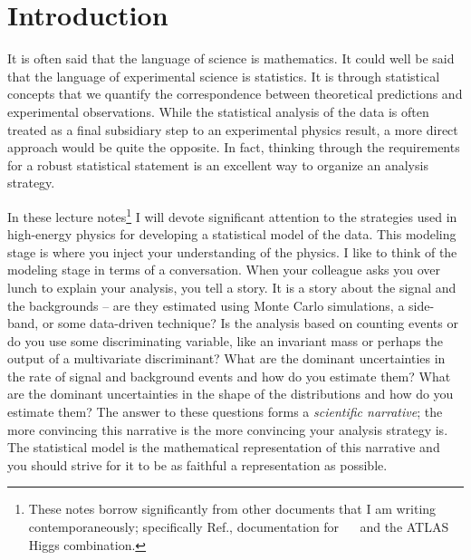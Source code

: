 \section{Introduction}


It is often said that the language of science is mathematics.  It could well be said that the language of experimental science is statistics.  It is through statistical concepts that we quantify the correspondence between theoretical predictions and experimental observations.  While the statistical analysis of the data is often treated as a final subsidiary step to an experimental physics result, a more direct approach would be quite the opposite.  In fact, thinking through the requirements for a robust statistical statement is an excellent way to organize an analysis strategy.  


In these lecture notes\footnote{These notes borrow significantly from other documents that I am writing contemporaneously; specifically Ref.\cite{asimov}, documentation for \HF\ ~\cite{histfactory} and the ATLAS Higgs combination. } I will devote significant attention to the strategies used in high-energy physics for developing a statistical model of the data.  This modeling stage is where you inject your understanding of the physics.  I like to think of the modeling stage in terms of a conversation.  When your colleague asks you over lunch to explain your analysis, you tell a story.  It is a story about the signal and the backgrounds -- are they estimated using Monte Carlo simulations, a side-band, or some data-driven technique?    Is the analysis based on counting events or do you use some discriminating variable, like an invariant mass or perhaps the output of a multivariate discriminant?  What are the dominant uncertainties in the rate of signal and background events and how do you estimate them?  What are the dominant uncertainties in the shape of the distributions and how do you estimate them?  The answer to these questions forms a \textit{scientific narrative}; the more convincing this narrative is the more convincing your analysis strategy is.  The statistical model is the mathematical representation of this narrative and you should strive for it to be as faithful a representation as possible.


